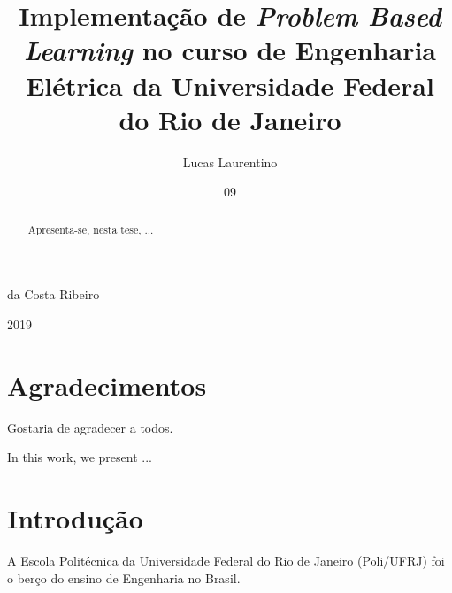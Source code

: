 \documentclass[grad,numbers]{coppe}
\begin{document}
    \title{Implementação de \textit{Problem Based Learning} no curso de Engenharia Elétrica da Universidade Federal do Rio de Janeiro}
    \author{Lucas Laurentino}{da Costa Ribeiro}
    
    
    
    \date{09}{2019}
    
    
    \maketitle
    
    \frontmatter

\dedication{Ao meu avô, \\Luiz Laurentino da Costa}

\chapter*{Agradecimentos}

  Gostaria de agradecer a todos.

\begin{abstract}

  Apresenta-se, nesta tese, ...

\end{abstract}

\begin{foreignabstract}

In this work, we present ...

\end{foreignabstract}

\tableofcontents
\listoffigures
\listoftables
\printlosymbols
\printloabbreviations


\mainmatter

\chapter{Introdução}
	A Escola Politécnica  da Universidade Federal do Rio de Janeiro  (Poli/UFRJ) foi o berço do ensino de Engenharia no Brasil. 
\end{document}
